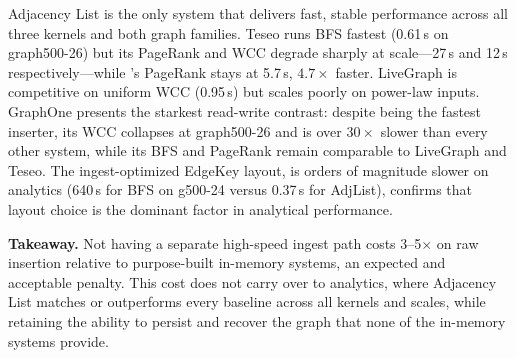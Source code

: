 
\project{} Adjacency List is the only system that delivers fast, stable performance across all three kernels and both graph families.
Teseo runs BFS fastest (0.61\,s on graph500-26) but its PageRank and WCC degrade sharply at scale---27\,s and 12\,s respectively---while \project{}'s PageRank stays at 5.7\,s, $4.7\times$ faster.
LiveGraph is competitive on uniform WCC (0.95\,s) but scales poorly on power-law inputs.
GraphOne presents the starkest read-write contrast: despite being the fastest inserter, its WCC collapses at graph500-26 and is over $30\times$ slower than every other system, while its BFS and PageRank remain comparable to LiveGraph and Teseo.
The ingest-optimized EdgeKey layout, is orders of magnitude slower on analytics (640\,s for BFS on g500-24 versus 0.37\,s for AdjList), confirms that layout choice is the dominant factor in analytical performance.

\textbf{Takeaway.}
Not having a separate high-speed ingest path costs \project{} 3--5$\times$ on raw insertion relative to purpose-built in-memory systems, an expected and acceptable penalty.
This cost does not carry over to analytics, where \project{} Adjacency List matches or outperforms every baseline across all kernels and scales, while retaining the ability to persist and recover the graph that none of the in-memory systems provide.